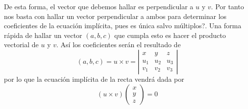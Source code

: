 De esta forma, el vector que debemos hallar es perpendicular a $u$ y $v$. Por tanto nos basta con hallar un vector perpendicular a ambos para determinar los coeficientes de la ecuación implícita, pues es única salvo múltiplos?. Una forma rápida de hallar un vector $(a,b,c)$ que cumpla esto es hacer el producto vectorial de $u$ y $v$. Así los coeficientes serán el resultado de 
\begin{equation*}
	(a,b,c)=u\times v=\left| \begin{array}{ccc}
		x & y & z\\
		u_1 & u_2 & u_3\\
		v_1 & v_2 & v_3
	\end{array}\right| 
\end{equation*}
por lo que la ecuación implícita de la recta vendrá dada por 
\begin{equation}
	(u\times v)\left( \begin{array}{c}
	x\\
	y\\
	z
	\end{array}\right) =0
\end{equation}
